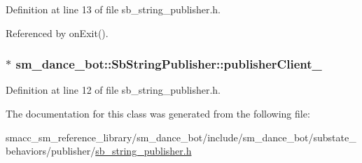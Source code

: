 Definition at line 13 of file sb\+\_\+string\+\_\+publisher.\+h.



Referenced by on\+Exit().

\subsubsection[{\texorpdfstring{publisher\+Client\+\_\+}{publisherClient_}}]{$\ast$ sm\+\_\+dance\+\_\+bot\+::\+Sb\+String\+Publisher\+::publisher\+Client\+\_\+}\hypertarget{classsm__dance__bot_1_1SbStringPublisher_ab24c4e17860a4a329df0ccc835486cbe}{}\label{classsm__dance__bot_1_1SbStringPublisher_ab24c4e17860a4a329df0ccc835486cbe}


Definition at line 12 of file sb\+\_\+string\+\_\+publisher.\+h.



The documentation for this class was generated from the following file\+:\begin{DoxyCompactItemize}
\item 
smacc\+\_\+sm\+\_\+reference\+\_\+library/sm\+\_\+dance\+\_\+bot/include/sm\+\_\+dance\+\_\+bot/substate\+\_\+behaviors/publisher/\hyperlink{sb__string__publisher_8h}{sb\+\_\+string\+\_\+publisher.\+h}\end{DoxyCompactItemize}
